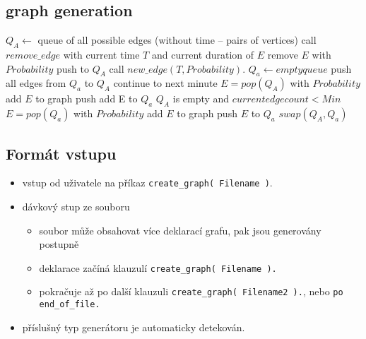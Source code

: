 \documentclass[11pt, a4paper]{article}
\newcommand{\pl}[1]{\texttt{#1}} %
\theoremstyle{plain}
\theoremstyle{definition}
\theoremstyle{remark}
\begin{document}
\subsection{graph generation}
\begin{algorithmic}[1]
    \State $Q_A \leftarrow$ queue of all possible edges (without time -- pairs of vertices)
            \State call $remove\_edge$ with current time $T$ and current duration of $E$
            \State remove $E$ with $Probability$
             push to $Q_A$ \EndIf
        \EndFor
        \State call $new\_edge( T, Probability )$.
        \State $Q_a \leftarrow empty queue$
                \State push all edges from $Q_a$ to $Q_A$
                \State continue to next minute
            \EndIf
            \State $E = pop( Q_A )$
            \State with $Probability$ add $E$ to graph
             push add E to $Q_a$ \EndIf
            \If $Q_A$ is empty and $current edge count < Min$
                    \State $E = pop( Q_a )$
                    \State with $Probability$ add $E$ to graph
                     push $E$ to $Q_a$ \EndIf
                \EndWhile
            \EndIf
        \EndWhile
        \State $swap( Q_A, Q_a )$ 
    \EndFor
\end{algorithmic}

\subsection{Formát vstupu}
\begin{itemize}
    \item vstup od uživatele na příkaz \pl{create\_graph( Filename )}.
    \item dávkový stup ze souboru
        \begin{itemize}
            \item soubor může obsahovat více deklarací grafu, pak jsou generovány postupně
            \item deklarace začíná klauzulí \pl{create\_graph( Filename ).}
            \item pokračuje až po další klauzuli \pl{create\_graph( Filename2 ).}, nebo
                \pl{po end\_of\_file.}
        \end{itemize}
    \item příslušný typ generátoru je automaticky detekován.
\end{itemize}
\end{document}
